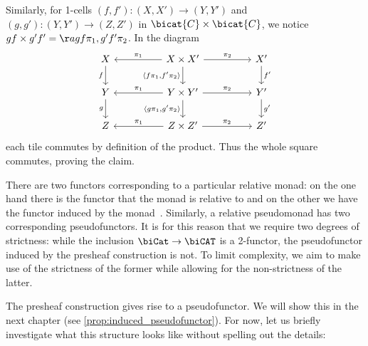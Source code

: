\begin{example}
  Similarly, for 1-cells $(f,f'):(X,X')\to (Y,Y')$ and $(g,g'):(Y,Y')\to (Z,Z')$ in
  $\bicat{C}\times\bicat{C}$, we notice $gf\times g'f' = \aa{gf\pi_1,g'f'\pi_2}$.
  In the diagram
  \begin{equation}
    \begin{tikzcd}
      X && {X\times X'} && {X'} \\
      Y && {Y\times Y'} && {Y'} \\
      Z && {Z\times Z'} && {Z'}
      \arrow["g"', from=2-1, to=3-1]
      \arrow["f"', from=1-1, to=2-1]
      \arrow["{f'}", from=1-5, to=2-5]
      \arrow["{g'}", from=2-5, to=3-5]
      \arrow["{\langle g\pi_1,g'\pi_2\rangle}"', from=2-3, to=3-3]
      \arrow["{\langle f\pi_1,f'\pi_2\rangle}"', from=1-3, to=2-3]
      \arrow["{\pi_1}"', from=1-3, to=1-1]
      \arrow["{\pi_2}", from=1-3, to=1-5]
      \arrow["{\pi_1}"', from=2-3, to=2-1]
      \arrow["{\pi_2}", from=2-3, to=2-5]
      \arrow["{\pi_1}"', from=3-3, to=3-1]
      \arrow["{\pi_2}", from=3-3, to=3-5]
    \end{tikzcd}
  \end{equation}
  each tile commutes by definition of the product. Thus the whole square
  commutes, proving the claim.
\end{example}

There are two functors corresponding to a particular relative monad: on the one hand there
is the functor that the monad is relative to and on the other we have the functor induced
by the monad~\cite{altenkirch2015}. Similarly, a relative pseudomonad has two corresponding
pseudofunctors. It is for this reason that we require two degrees of strictness: while
the inclusion $\biCat\to\biCAT$ is a 2-functor, the pseudofunctor induced by the presheaf
construction is not. To limit complexity, we aim to make use of the strictness of the former
while allowing for the non-strictness of the latter.

The presheaf construction gives rise to a pseudofunctor. We will show this in
the next chapter (see \ref{prop:induced_pseudofunctor}). For now, let us
briefly investigate what this structure looks like without spelling out the
details:

